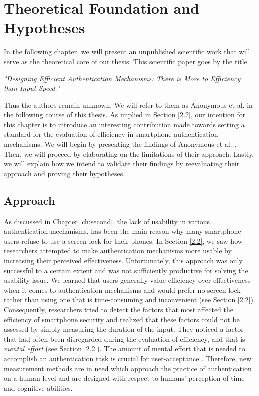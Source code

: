 
\chapter{Theoretical Foundation and Hypotheses}\label{ch:third}

In the following chapter, we will present an unpublished scientific work that will serve as the theoretical core of our thesis. This scientific paper goes by the title 
\begin{center}
 \textit{"Designing Efficient Authentication Mechanisms: There is More to Efficiency than Input Speed."}   
\end{center}
Thus the authors remain unknown. We will refer to them as Anonymous et al. \cite{anonymous} in the following course of this thesis. As implied in Section \ref{2.2}, our intention for this chapter is to introduce an interesting contribution made towards setting a standard for the evaluation of efficiency in smartphone authentication mechanisms. We will begin by presenting the findings of Anonymous et al. \cite{anonymous}. Then, we will proceed by elaborating on the limitations of their approach. Lastly, we will explain how we intend to validate their findings by reevaluating their approach and proving their hypotheses.

\section{Approach}

As discussed in Chapter \ref{ch:second}, the lack of usability in various authentication mechanisms, has been the main reason why many smartphone users refuse to use a screen lock for their phones. In Section \ref{2.2}, we saw how researchers attempted to make authentication mechanisms more usable by increasing their perceived effectiveness. Unfortunately, this approach was only successful to a certain extent and was not sufficiently productive for solving the usability issue. We learned that users generally value efficiency over effectiveness when it comes to authentication mechanisms and would prefer no screen lock rather than using one that is time-consuming and inconvenient (see Section \ref{2.2}). Consequently, researchers tried to detect the factors that most affected the efficiency of smartphone security and realized that these factors could not be assessed by simply measuring the duration of the input. They noticed a factor that had often been disregarded during the evaluation of efficiency, and that is \textit{mental effort} (see Section \ref{2.2}). The amount of mental effort that is needed to accomplish an authentication task is crucial for user-acceptance \cite{anonymous}. Therefore, new measurement methods are in need which approach the practice of authentication on a human level and are designed with respect to humans' perception of time and cognitive abilities. \\


